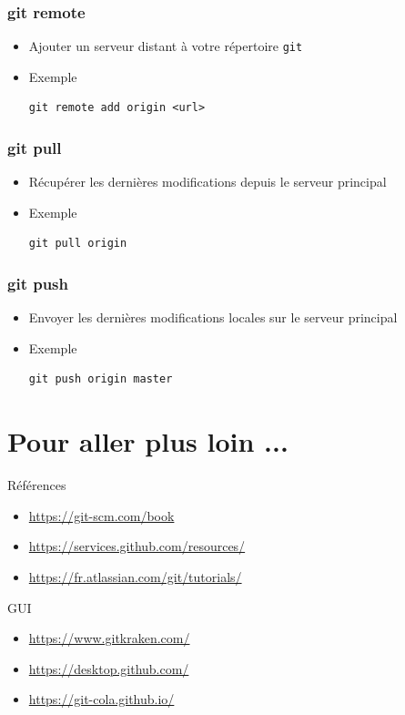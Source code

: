\documentclass{beamer}
\begin{document}
\begin{frame}[fragile]
\frametitle{git remote}

\begin{itemize}
\item Ajouter un serveur distant à votre répertoire \texttt{git}
\item Exemple
\begin{lstlisting}
git remote add origin <url>
\end{lstlisting}
\end{itemize}
\end{frame}


\begin{frame}[fragile]
\frametitle{git pull}

\begin{itemize}
\item Récupérer les dernières modifications depuis le serveur principal
\item Exemple
\begin{lstlisting}
git pull origin
\end{lstlisting}
\end{itemize}
\end{frame}

\begin{frame}[fragile]
\frametitle{git push}

\begin{itemize}
\item Envoyer les dernières modifications locales sur le serveur principal
\item Exemple
\begin{lstlisting}
git push origin master
\end{lstlisting}
\end{itemize}
\end{frame}

\section{Pour aller plus loin ...}

\begin{frame}{Références}
\begin{itemize}
    \item \url{https://git-scm.com/book}
    \item \url{https://services.github.com/resources/}
    \item \url{https://fr.atlassian.com/git/tutorials/}
\end{itemize}
\end{frame}

\begin{frame}{GUI}
    \begin{itemize}
      \item \url{https://www.gitkraken.com/}
        \item \url{https://desktop.github.com/}
        \item \url{https://git-cola.github.io/}
    \end{itemize}
\end{frame}

\end{document}

